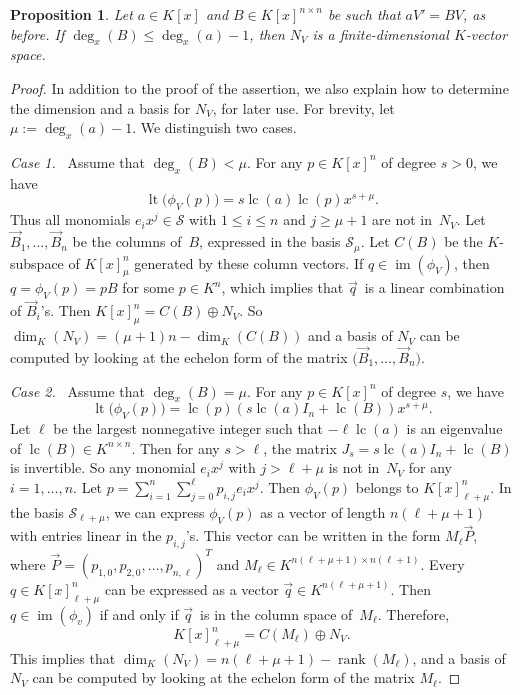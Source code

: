 \documentclass{sig-alternate}
\newtheorem{prop}[theorem]{Proposition}
\newcommand{\cS}{ {\mathcal S}}
\def\lc{\operatorname{lc}}
\def\rank{\operatorname{rank}}
\def\lt{\operatorname{lt}}
\def\im{\operatorname{im}}
\begin{document}
\begin{prop}\label{PROP:finite}
Let $a\in K[x]$ and $B\in K[x]^{n \times n}$ be such that $aV'=BV$, as before.
If $\deg_x(B) \leq \deg_x(a)-1$, then $N_V$ is a finite-dimensional
$K$-vector space.
\end{prop}
\begin{proof}
In addition to the proof of the assertion, we also explain how to determine
the dimension and a basis for $N_V$, for later use. For brevity, let
$\mu:=\deg_x(a)-1$. We distinguish two cases.

\smallskip
{\it Case 1.}~
Assume that $\deg_x(B) < \mu$. For any $p\in K[x]^n$ of degree $s>0$, we have
\[
  \lt\bigl(\phi_V(p)\bigr) = s\lc(a)\lc(p)x^{s+\mu}.
\]
Thus all monomials $e_i x^j\in \cS$ with $1\leq i\leq n$ and $j\geq \mu+1$ are not in~$N_V$.
Let $\vec{B}_1, \ldots, \vec{B}_n$ be the columns of~$B$, expressed in the basis $\cS_\mu$.
Let $C(B)$ be the $K$-subspace of $K[x]_\mu^n$ generated by these column vectors.
If $q\in \im(\phi_V)$, then $q = \phi_V(p) = pB$ for some $p \in K^n$, which implies that
$\vec{q}\,$ is a linear combination of $\vec{B}_i$'s. Then $K[x]_\mu^n = C(B) \oplus N_V$.
So $\dim_K(N_V)= (\mu+1)n - \dim_K(C(B))$ and a basis of $N_V$ can be computed by
looking at the echelon form of the matrix $\bigl(\vec{B}_1, \ldots, \vec{B}_n\bigr)$.

\smallskip
{\it Case 2.}~
Assume that $\deg_x(B) =\mu$. For any $p\in K[x]^n$ of degree $s$, we have
\[
  \lt\bigl(\phi_V(p)\bigr) = \lc(p)(s\lc(a)I_n + \lc(B))x^{s+\mu}.
\]
Let $\ell$ be the largest nonnegative integer such that $-\ell \lc(a)$ is an
eigenvalue of $\lc(B)\in K^{n\times n}$. Then for any $s>\ell$,
the matrix $J_s = s\lc(a)I_n + \lc(B)$ is invertible. So any monomial $e_ix^j$ with $j> \ell+\mu$ is not in~$N_V$
for any $i=1, \ldots, n$. Let $p = \sum_{i=1}^n \sum_{j=0}^{\ell} p_{i, j} e_ix^j$.
Then $\phi_V(p)$ belongs to $K[x]_{\ell+\mu}^n$.
In the basis $\cS_{\ell+\mu}$, we can
express $\phi_V(p)$ as a vector of length ${n(\ell+\mu+1)}$ with entries linear in the $p_{i, j}$'s.
This vector can be written in the form $M_{\ell} \vec{P}$,
where $\vec{P} = (p_{1, 0}, p_{2, 0}, \ldots, p_{n, \ell})^T$ and $M_{\ell} \in K^{n(\ell+\mu+1) \times n(\ell+1)}$.
Every $q\in K[x]_{\ell+\mu}^n$ can be expressed as a vector $\vec{q} \in K^{n(\ell + \mu +1)}$.
Then $q\in\im(\phi_v)$ if and only if $\vec{q}\,$ is in the column space of~$M_{\ell}$.
Therefore,
\[K[x]_{\ell+\mu}^n = C({M_{\ell}}) \oplus N_V. \]
This implies that $\dim_K(N_V) = n(\ell+\mu+1) - \rank({M_{\ell}})$, and
a basis of $N_V$ can be computed by
looking at the echelon form of the matrix ${M_{\ell}}$.
\end{proof}
\end{document}
